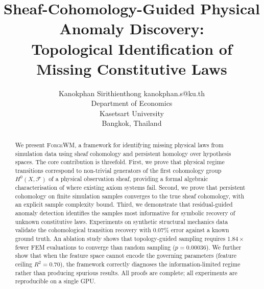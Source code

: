 \documentclass[twoside,11pt]{article}
\newcommand{\FA}{\mathcal{F}}
\newcommand{\ForgeWM}{\textsc{ForgeWM}\xspace}
\begin{document}
\title{Sheaf-Cohomology-Guided Physical Anomaly Discovery:\\
  Topological Identification of Missing Constitutive Laws}

\author{%
  \name Kanokphan Sirithienthong \email kanokphan.s@ku.th\\
  \addr Department of Economics\\
  Kasetsart University\\
  Bangkok, Thailand
}

\maketitle
{}

\begin{abstract}
We present \ForgeWM, a framework for identifying missing physical laws
from simulation data using sheaf cohomology and persistent homology over
hypothesis spaces. The core contribution is threefold. First, we prove
that physical regime transitions correspond to non-trivial generators of
the first cohomology group $H^0(X,\FA)$ of a physical observation
sheaf, providing a formal algebraic characterisation of where existing
axiom systems fail. Second, we prove that persistent cohomology on
finite simulation samples converges to the true sheaf cohomology, with
an explicit sample complexity bound. Third, we demonstrate that
residual-guided anomaly detection identifies the samples most
informative for symbolic recovery of unknown constitutive laws.
Experiments on synthetic structural mechanics data validate the
cohomological transition recovery with $0.07\%$ error against a known
ground truth. An ablation study shows that topology-guided sampling
requires $1.84\times$ fewer FEM evaluations to converge than random
sampling ($p = 0.00036$). We further show that when the feature space
cannot encode the governing parameters (feature ceiling $R^2 = 0.70$),
the framework correctly diagnoses the information-limited regime rather
than producing spurious results. All proofs are complete; all
experiments are reproducible on a single GPU.
\end{abstract}

\end{document}
